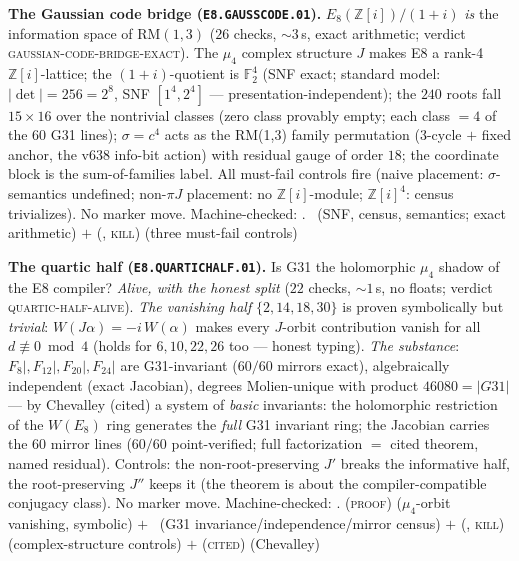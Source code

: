 \documentclass[11pt,a4paper]{article}
\theoremstyle{definition}
\begin{document}
\par\smallskip\noindent\textbf{The Gaussian code bridge
(\texttt{E8.GAUSSCODE.01}).}
$E_8(\mathbb{Z}[i])/(1+i)$ \emph{is} the information space of
$\mathrm{RM}(1,3)$ ($26$ checks, ${\sim}3$\,s, exact arithmetic;
verdict \textsc{gaussian-code-bridge-exact}).  The $\mu_4$ complex
structure $J$ makes E8 a rank-4 $\mathbb{Z}[i]$-lattice; the
$(1+i)$-quotient is $\mathbb{F}_2^4$ (SNF exact; standard model:
$|\det|=256=2^8$, SNF $[1^4,2^4]$ --- presentation-independent);
the $240$ roots fall $15\times16$ over the nontrivial classes (zero
class provably empty; each class $=4$ of the $60$ G31 lines);
$\sigma=c^4$ acts as the RM(1,3) family permutation (3-cycle $+$
fixed anchor, the v638 info-bit action) with residual gauge of order
$18$; the coordinate block is the sum-of-families label.  All
must-fail controls fire (naive placement: $\sigma$-semantics
undefined; non-$\pi J$ placement: no $\mathbb{Z}[i]$-module;
$\mathbb{Z}[i]^4$: census trivializes).  No marker move.
Machine-checked: .
\mE\ (SNF, census, semantics; exact arithmetic) $+$ (\mE,
\textsc{kill}) (three must-fail controls)
\par\smallskip

\par\smallskip\noindent\textbf{The quartic half
(\texttt{E8.QUARTICHALF.01}).}
Is G31 the holomorphic $\mu_4$ shadow of the E8 compiler?
\emph{Alive, with the honest split} ($22$ checks, ${\sim}1$\,s, no
floats; verdict \textsc{quartic-half-alive}).  \emph{The vanishing
half} $\{2,14,18,30\}$ is proven symbolically but \emph{trivial}:
$W(J\alpha)=-i\,W(\alpha)$ makes every $J$-orbit contribution vanish
for all $d\not\equiv0\bmod4$ (holds for $6,10,22,26$ too --- honest
typing).  \emph{The substance}: $F_8|,F_{12}|,F_{20}|,F_{24}|$ are
G31-invariant ($60/60$ mirrors exact), algebraically independent
(exact Jacobian), degrees Molien-unique with product
$46080=|G31|$ --- by Chevalley (cited) a system of \emph{basic}
invariants: the holomorphic restriction of the $W(E_8)$ ring
generates the \emph{full} G31 invariant ring; the Jacobian carries
the $60$ mirror lines ($60/60$ point-verified; full factorization
$=$ cited theorem, named residual).  Controls: the non-root-preserving
$J'$ breaks the informative half, the root-preserving $J''$ keeps it
(the theorem is about the compiler-compatible conjugacy class).  No
marker move.
Machine-checked: .
(\textsc{proof}) ($\mu_4$-orbit vanishing, symbolic) $+$ \mE\ (G31
invariance/independence/mirror census) $+$ (\mE, \textsc{kill})
(complex-structure controls) $+$ (\textsc{cited}) (Chevalley)
\par\smallskip
\end{document}
